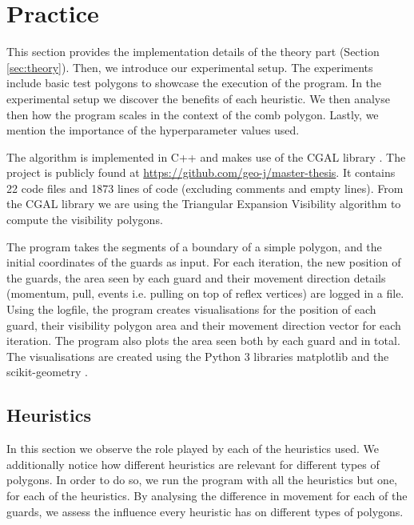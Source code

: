 \section{Practice}
\label{sec:experiments}


This section provides the implementation details of the theory part (Section \ref{sec:theory}). Then, we  introduce our experimental setup. The experiments include basic test polygons to showcase the execution of the program. In the experimental setup we discover the benefits of each heuristic. We then analyse then how the program scales in the context of the comb polygon. Lastly, we  mention the importance of the hyperparameter values used.

The algorithm is implemented in C++ and makes use of the CGAL library \cite{cgal}. The project is publicly found at \url{https://github.com/geo-j/master-thesis}. It contains 22 code files and 1873 lines of code (excluding comments and empty lines).
From the CGAL library we are using the Triangular Expansion Visibility algorithm \cite{DBLP:journals/corr/BungiuHHHK14} to compute the visibility polygons.

The program takes the segments of a boundary of a simple polygon, and the initial coordinates of the guards as input. For each iteration, the new position of the guards, the area seen by each guard and their movement direction details (momentum, pull, events i.e. pulling on top of reflex vertices) are logged in a file. Using the logfile, the program creates visualisations for the position of each guard, their visibility polygon area and their movement direction vector for each iteration. The program also plots the area seen both by each guard and in total. The visualisations are created using the Python 3 libraries matplotlib \cite{matplotlib} and the scikit-geometry \cite{scikit-geometry}.





\subsection{Heuristics}
In this section we  observe the role played by each of the heuristics used. We  additionally notice how different heuristics are relevant for different types of polygons. In order to do so, we  run the program with all the heuristics but one, for each of the heuristics. By analysing the difference in movement for each of the guards, we assess the influence every heuristic has on different types of polygons.

